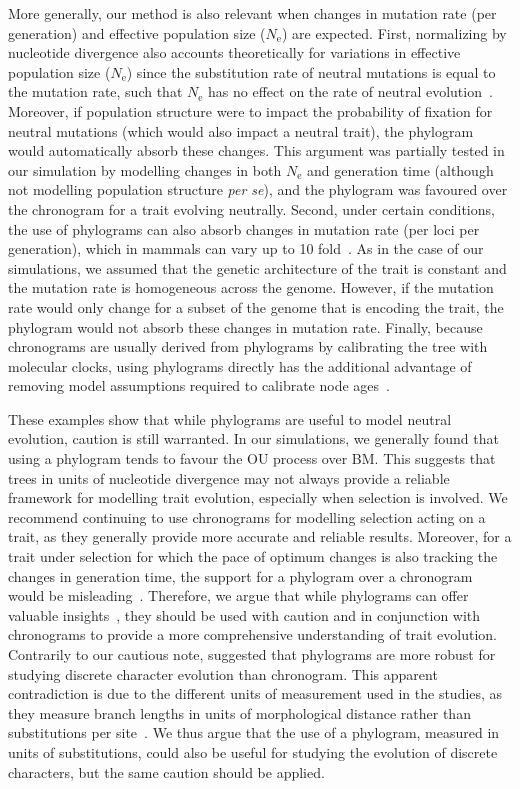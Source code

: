 \documentclass{article}
\newcommand{\Ne}{N_{\text{e}}}
\begin{document}
More generally, our method is also relevant when changes in mutation rate (per generation) and effective population size ($\Ne$) are expected.
First, normalizing by nucleotide divergence also accounts theoretically for variations in effective population size ($\Ne$) since the substitution rate of neutral mutations is equal to the mutation rate, such that $\Ne$ has no effect on the rate of neutral evolution~\citep{kimura_evolutionary_1968, ohta_population_1972}.
Moreover, if population structure were to impact the probability of fixation for neutral mutations (which would also impact a neutral trait), the phylogram would automatically absorb these changes.
This argument was partially tested in our simulation by modelling changes in both $\Ne$ and generation time (although not modelling population structure \textit{per se}), and the phylogram was favoured over the chronogram for a trait evolving neutrally.
Second, under certain conditions, the use of phylograms can also absorb changes in mutation rate (per loci per generation), which in mammals can vary up to 10 fold~\citep{bergeron_evolution_2023}.
As in the case of our simulations, we assumed that the genetic architecture of the trait is constant and the mutation rate is homogeneous across the genome.
However, if the mutation rate would only change for a subset of the genome that is encoding the trait, the phylogram would not absorb these changes in mutation rate.
Finally, because chronograms are usually derived from phylograms by calibrating the tree with molecular clocks, using phylograms directly has the additional advantage of removing model assumptions required to calibrate node ages~\citep{litsios_effects_2012}.

These examples show that while phylograms are useful to model neutral evolution, caution is still warranted.
In our simulations, we generally found that using a phylogram tends to favour the OU process over BM.
This suggests that trees in units of nucleotide divergence may not always provide a reliable framework for modelling trait evolution, especially when selection is involved.
We recommend continuing to use chronograms for modelling selection acting on a trait, as they generally provide more accurate and reliable results.
Moreover, for a trait under selection for which the pace of optimum changes is also tracking the changes in generation time, the support for a phylogram over a chronogram would be misleading~\citep{litsios_effects_2012}.
Therefore, we argue that while phylograms can offer valuable insights~\citep{wilson_chronogram_2022}, they should be used with caution and in conjunction with chronograms to provide a more comprehensive understanding of trait evolution.
Contrarily to our cautious note, \citet{wilson_chronogram_2022} suggested that phylograms are more robust for studying discrete character evolution than chronogram.
This apparent contradiction is due to the different units of measurement used in the studies, as they measure branch lengths in units of morphological distance rather than substitutions per site~\citep{wilson_chronogram_2022}.
We thus argue that the use of a phylogram, measured in units of substitutions, could also be useful for studying the evolution of discrete characters, but the same caution should be applied.
\end{document}
